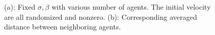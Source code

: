 \begin{figure}[htb]
  \centering
  \caption{(a): Fixed $\sigma, \beta$ with various number of agents. The initial velocity are all randomized and nonzero. (b): Corresponding averaged distance between neighboring agents.}\label{fig:multiple_distance}
\end{figure}

